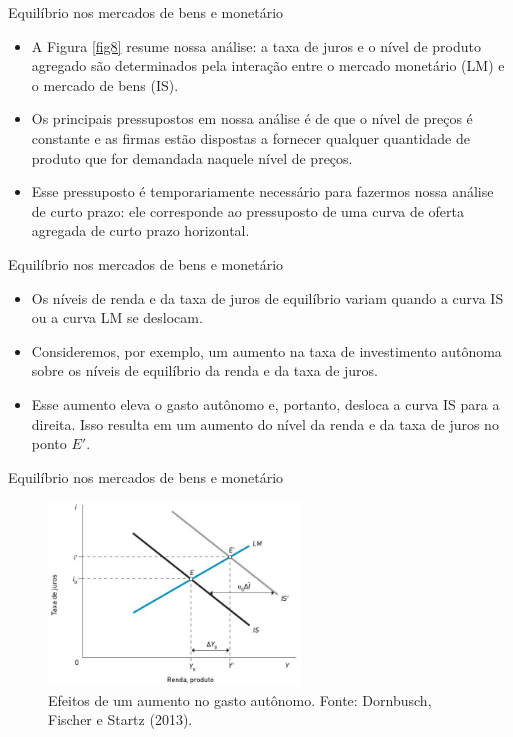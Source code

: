 \documentclass[10pt]{beamer}
\begin{document}
\begin{frame}{Equilíbrio nos mercados de bens e monetário}
\begin{itemize}
    \item A Figura \ref{fig8} resume nossa análise: a taxa de juros e o nível de produto agregado são determinados pela interação entre o mercado monetário (LM) e o mercado de bens (IS).
    \bigskip
    \item Os principais pressupostos em nossa análise é de que o nível de preços é constante e as firmas estão dispostas a fornecer qualquer quantidade de produto que for demandada naquele nível de preços.
    \bigskip
    \item Esse pressuposto é temporariamente necessário para fazermos nossa análise de curto prazo: ele corresponde ao pressuposto de uma curva de oferta agregada de curto prazo horizontal.
\end{itemize}
\end{frame}

\begin{frame}{Equilíbrio nos mercados de bens e monetário}
\begin{itemize}
    \item Os níveis de renda e da taxa de juros de equilíbrio variam quando a curva IS ou a curva LM se deslocam.
    \bigskip
    \item Consideremos, por exemplo, um aumento na taxa de investimento autônoma sobre os níveis de equilíbrio da renda e da taxa de juros.
    \bigskip
    \item Esse aumento eleva o gasto autônomo e, portanto, desloca a curva IS para a direita. Isso resulta em um aumento do nível da renda e da taxa de juros no ponto $E'$.
\end{itemize}
\end{frame}

\begin{frame}{Equilíbrio nos mercados de bens e monetário}
\begin{figure}
    \centering
    \includegraphics[width=0.6\textwidth]{./figures/aula092_fig9.JPG}
    \caption{Efeitos de um aumento no gasto autônomo. Fonte: Dornbusch, Fischer e Startz (2013).}
    \label{fig9}
\end{figure}
\end{frame}
\end{document}
